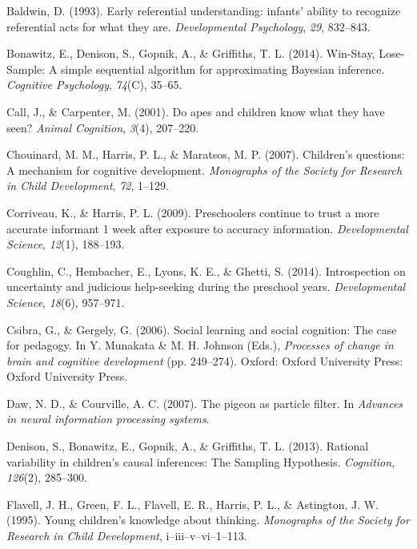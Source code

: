 \documentclass[english,man]{apa6}
\theoremstyle{definition}
\theoremstyle{definition}
\theoremstyle{definition}
\theoremstyle{remark}
\begin{document}
\hypertarget{ref-Baldwin1993}{}
Baldwin, D. (1993). Early referential understanding: infants' ability to
recognize referential acts for what they are. \emph{Developmental
Psychology}, \emph{29}, 832--843.

\hypertarget{ref-Bonawitz2014}{}
Bonawitz, E., Denison, S., Gopnik, A., \& Griffiths, T. L. (2014).
Win-Stay, Lose-Sample: A simple sequential algorithm for approximating
Bayesian inference. \emph{Cognitive Psychology}, \emph{74}(C), 35--65.

\hypertarget{ref-Call2001}{}
Call, J., \& Carpenter, M. (2001). Do apes and children know what they
have seen? \emph{Animal Cognition}, \emph{3}(4), 207--220.

\hypertarget{ref-Chouinard2007}{}
Chouinard, M. M., Harris, P. L., \& Maratsos, M. P. (2007). Children's
questions: A mechanism for cognitive development. \emph{Monographs of
the Society for Research in Child Development}, \emph{72}, 1--129.

\hypertarget{ref-Corriveau2009}{}
Corriveau, K., \& Harris, P. L. (2009). Preschoolers continue to trust a
more accurate informant 1 week after exposure to accuracy information.
\emph{Developmental Science}, \emph{12}(1), 188--193.

\hypertarget{ref-Coughlin2014}{}
Coughlin, C., Hembacher, E., Lyons, K. E., \& Ghetti, S. (2014).
Introspection on uncertainty and judicious help-seeking during the
preschool years. \emph{Developmental Science}, \emph{18}(6), 957--971.

\hypertarget{ref-Csibra2006}{}
Csibra, G., \& Gergely, G. (2006). Social learning and social cognition:
The case for pedagogy. In Y. Munakata \& M. H. Johnson (Eds.),
\emph{Processes of change in brain and cognitive development} (pp.
249--274). Oxford: Oxford University Press: Oxford University Press.

\hypertarget{ref-Daw2007}{}
Daw, N. D., \& Courville, A. C. (2007). The pigeon as particle filter.
In \emph{Advances in neural information processing systems}.

\hypertarget{ref-Denison2013}{}
Denison, S., Bonawitz, E., Gopnik, A., \& Griffiths, T. L. (2013).
Rational variability in children's causal inferences: The Sampling
Hypothesis. \emph{Cognition}, \emph{126}(2), 285--300.

\hypertarget{ref-Flavell1995}{}
Flavell, J. H., Green, F. L., Flavell, E. R., Harris, P. L., \&
Astington, J. W. (1995). Young children's knowledge about thinking.
\emph{Monographs of the Society for Research in Child Development},
i--iii--v--vi--1--113.
\end{document}
